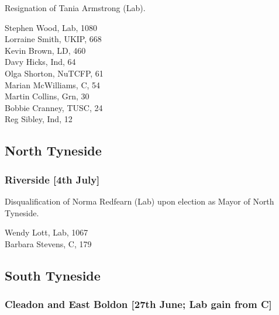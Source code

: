\documentclass[a4paper,openany,10pt]{book}
\begin{document}

Resignation of Tania Armstrong (Lab).



Stephen Wood, Lab, 1080\\
Lorraine Smith, UKIP, 668\\
Kevin Brown, LD, 460\\
Davy Hicks, Ind, 64\\
Olga Shorton, NuTCFP, 61\\
{Marian McWilliams}, C, 54\\
Martin Collins, Grn, 30\\
Bobbie Cranney, TUSC, 24\\
Reg Sibley, Ind, 12\\


\subsection*{North Tyneside}

\subsubsection*{Riverside \hspace*{\fill}\nolinebreak[1]%
\enspace\hspace*{\fill}
[4th July]}


Disqualification of Norma Redfearn (Lab) upon election as Mayor of North Tyneside.



Wendy Lott, Lab, 1067\\
Barbara Stevens, C, 179\\


\subsection*{South Tyneside}

\subsubsection*{Cleadon and East Boldon \hspace*{\fill}\nolinebreak[1]%
\enspace\hspace*{\fill}
[27th June; Lab gain from C]}
\end{document}
